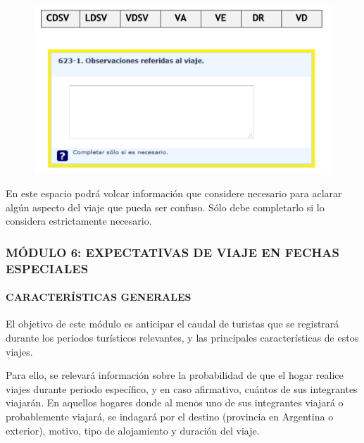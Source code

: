\documentclass[
  openany]{book}
\begin{document}
\begin{figure}

{\centering \includegraphics[width=1\linewidth]{imagenes/figura6-127} 

}

\end{figure}

En este espacio podrá volcar información que considere necesario para aclarar algún aspecto del viaje que pueda ser confuso. Sólo debe completarlo si lo considera estrictamente necesario.

\hypertarget{muxf3dulo-6-expectativas-de-viaje-en-fechas-especiales}{%
\subsubsection{\texorpdfstring{\textbf{MÓDULO 6: EXPECTATIVAS DE VIAJE EN FECHAS ESPECIALES}}{MÓDULO 6: EXPECTATIVAS DE VIAJE EN FECHAS ESPECIALES}}\label{muxf3dulo-6-expectativas-de-viaje-en-fechas-especiales}}

\hypertarget{caracteruxedsticas-generales}{%
\paragraph{\texorpdfstring{\textbf{CARACTERÍSTICAS GENERALES}}{CARACTERÍSTICAS GENERALES}}\label{caracteruxedsticas-generales}}

El objetivo de este módulo es anticipar el caudal de turistas que se registrará durante los periodos turísticos relevantes, y las principales características de estos viajes.

Para ello, se relevará información sobre la probabilidad de que el hogar realice viajes durante periodo específico, y en caso afirmativo, cuántos de sus integrantes viajarán. En aquellos hogares donde al menos uno de sus integrantes viajará o probablemente viajará, se indagará por el destino (provincia en Argentina o exterior), motivo, tipo de alojamiento y duración del viaje.
\end{document}
